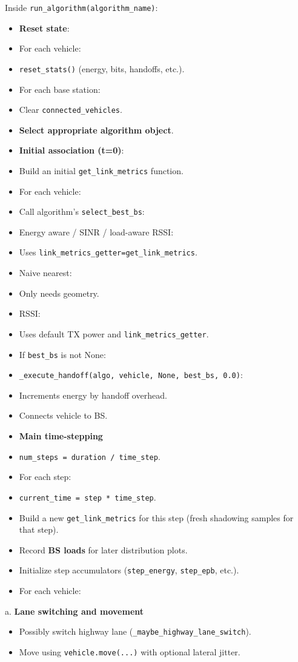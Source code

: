 \documentclass[conference]{IEEEtran}
\begin{document}
Inside \texttt{run\_algorithm(algorithm\_name)}:
\begin{itemize}
\item \textbf{Reset state}:
\item For each vehicle:
\item \texttt{reset\_stats()} (energy, bits, handoffs, etc.).
\item For each base station:
\item Clear \texttt{connected\_vehicles}.
\item \textbf{Select appropriate algorithm object}.
\item \textbf{Initial association (t=0)}:
\item Build an initial \texttt{get\_link\_metrics} function.
\item For each vehicle:
\item Call algorithm’s \texttt{select\_best\_bs}:
\item Energy aware / SINR / load-aware RSSI:
\item Uses \texttt{link\_metrics\_getter=get\_link\_metrics}.
\item Naive nearest:
\item Only needs geometry.
\item RSSI:
\item Uses default TX power and \texttt{link\_metrics\_getter}.
\item If \texttt{best\_bs} is not None:
\item \texttt{\_execute\_handoff(algo, vehicle, None, best\_bs, 0.0)}:
\item Increments energy by handoff overhead.
\item Connects vehicle to BS.
\item \textbf{Main time-stepping}
\item \texttt{num\_steps = duration / time\_step}.
\item For each step:
\item \texttt{current\_time = step * time\_step}.
\item Build a new \texttt{get\_link\_metrics} for this step (fresh shadowing samples for that step).
\item Record \textbf{BS loads} for later distribution plots.
\item Initialize step accumulators (\texttt{step\_energy}, \texttt{step\_epb}, etc.).
\item For each vehicle:
\end{itemize}

       a. \textbf{Lane switching and movement}
\begin{itemize}
\item Possibly switch highway lane (\texttt{\_maybe\_highway\_lane\_switch}).
\item Move using \texttt{vehicle.move(...)} with optional lateral jitter.
\end{itemize}
\end{document}
